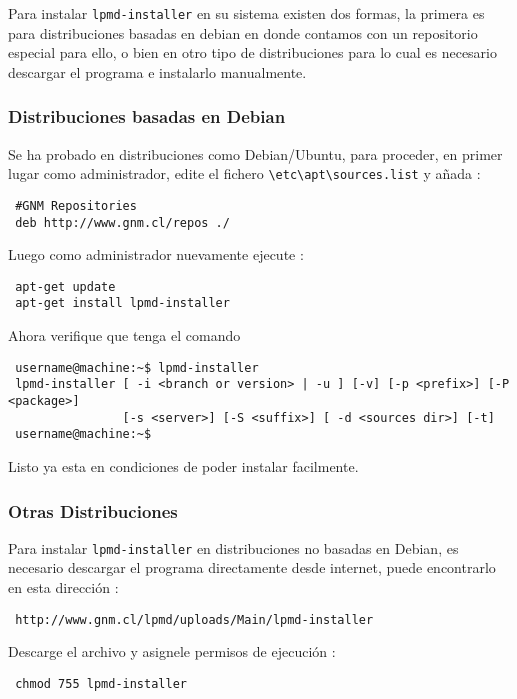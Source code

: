 Para instalar \verb|lpmd-installer| en su sistema existen dos formas, la primera es para distribuciones basadas en debian en donde contamos con un repositorio especial para ello, o bien en otro tipo de distribuciones para lo cual es necesario descargar el programa e instalarlo manualmente.

\subsubsection{Distribuciones basadas en Debian}

Se ha probado en distribuciones como Debian/Ubuntu, para proceder, en primer lugar como administrador, edite el fichero \verb|\etc\apt\sources.list| y a\~nada :

\begin{verbatim}
 #GNM Repositories
 deb http://www.gnm.cl/repos ./
\end{verbatim}

Luego como administrador nuevamente ejecute :

\begin{verbatim}
 apt-get update
 apt-get install lpmd-installer
\end{verbatim}

Ahora verifique que tenga el comando
\begin{verbatim}
 username@machine:~$ lpmd-installer 
 lpmd-installer [ -i <branch or version> | -u ] [-v] [-p <prefix>] [-P <package>] 
                [-s <server>] [-S <suffix>] [ -d <sources dir>] [-t]
 username@machine:~$
\end{verbatim}

Listo ya esta en condiciones de poder instalar {\lpmd} facilmente.

\subsubsection{Otras Distribuciones}

Para instalar \verb|lpmd-installer| en distribuciones no basadas en Debian, es necesario descargar el programa directamente desde internet, puede encontrarlo en esta direcci\'on :

\begin{verbatim}
 http://www.gnm.cl/lpmd/uploads/Main/lpmd-installer
\end{verbatim}

Descarge el archivo y asignele permisos de ejecuci\'on :

\begin{verbatim}
 chmod 755 lpmd-installer
\end{verbatim}

